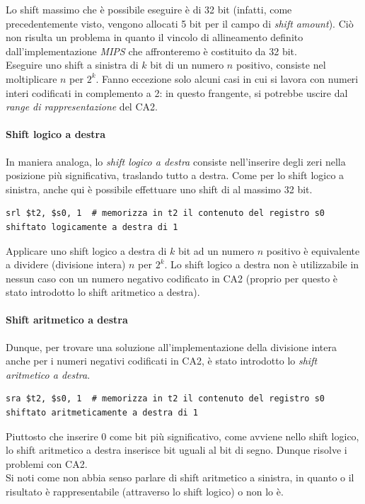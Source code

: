 \documentclass[class=book, crop=false]{standalone}
\begin{document}
Lo shift massimo che è possibile eseguire è di 32 bit (infatti, come precedentemente visto, vengono allocati 5 bit per il campo di \emph{shift amount}). Ciò non risulta un problema in quanto il vincolo di allineamento definito dall'implementazione \emph{MIPS} che affronteremo è costituito da 32 bit.\\
Eseguire uno shift a sinistra di \(k\) bit di un numero \(n\) positivo, consiste nel moltiplicare \(n\) per \(2^k\). Fanno eccezione solo alcuni casi in cui si lavora con numeri interi codificati in complemento a 2: in questo frangente, si potrebbe uscire dal \emph{range di rappresentazione} del CA2.

\paragraph{Shift logico a destra}
In maniera analoga, lo \emph{shift logico a destra} consiste nell'inserire degli zeri nella posizione più significativa, traslando tutto a destra. Come per lo shift logico a sinistra, anche qui è possibile effettuare uno shift di al massimo 32 bit.

\begin{verbatim}
srl $t2, $s0, 1  # memorizza in t2 il contenuto del registro s0 shiftato logicamente a destra di 1
\end{verbatim}

Applicare uno shift logico a destra di \(k\) bit ad un numero \(n\) positivo è equivalente a dividere (divisione intera) \(n\) per \(2^k\). Lo shift logico a destra non è utilizzabile in nessun caso con un numero negativo codificato in CA2 (proprio per questo è stato introdotto lo shift aritmetico a destra).

\paragraph{Shift aritmetico a destra}
Dunque, per trovare una soluzione all'implementazione della divisione intera anche per i numeri negativi codificati in CA2, è stato introdotto lo \emph{shift aritmetico a destra}.

\begin{verbatim}
sra $t2, $s0, 1  # memorizza in t2 il contenuto del registro s0 shiftato aritmeticamente a destra di 1
\end{verbatim}

Piuttosto che inserire 0 come bit più significativo, come avviene nello shift logico, lo shift aritmetico a destra inserisce bit uguali al bit di segno. Dunque risolve i problemi con CA2.\\
Si noti come non abbia senso parlare di shift aritmetico a sinistra, in quanto o il risultato è rappresentabile (attraverso lo shift logico) o non lo è.
\end{document}
